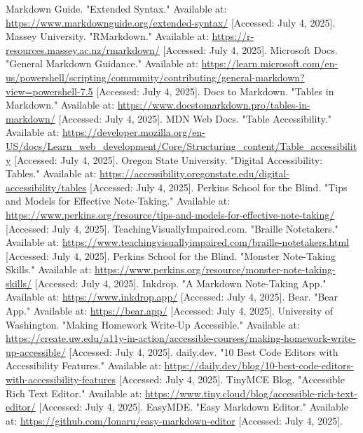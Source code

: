\begin{thebibliography}{99}
	 Markdown Guide. "Extended Syntax." Available at: \url{https://www.markdownguide.org/extended-syntax/} [Accessed: July 4, 2025].
	 Massey University. "RMarkdown." Available at: \url{https://r-resources.massey.ac.nz/rmarkdown/} [Accessed: July 4, 2025].
	 Microsoft Docs. "General Markdown Guidance." Available at: \url{https://learn.microsoft.com/en-us/powershell/scripting/community/contributing/general-markdown?view=powershell-7.5} [Accessed: July 4, 2025].
	 Docs to Markdown. "Tables in Markdown." Available at: \url{https://www.docstomarkdown.pro/tables-in-markdown/} [Accessed: July 4, 2025].
	 MDN Web Docs. "Table Accessibility." Available at: \url{https://developer.mozilla.org/en-US/docs/Learn_web_development/Core/Structuring_content/Table_accessibility} [Accessed: July 4, 2025].
	 Oregon State University. "Digital Accessibility: Tables." Available at: \url{https://accessibility.oregonstate.edu/digital-accessibility/tables} [Accessed: July 4, 2025].
	 Perkins School for the Blind. "Tips and Models for Effective Note-Taking." Available at: \url{https://www.perkins.org/resource/tips-and-models-for-effective-note-taking/} [Accessed: July 4, 2025].
	 TeachingVisuallyImpaired.com. "Braille Notetakers." Available at: \url{https://www.teachingvisuallyimpaired.com/braille-notetakers.html} [Accessed: July 4, 2025].
	 Perkins School for the Blind. "Monster Note-Taking Skills." Available at: \url{https://www.perkins.org/resource/monster-note-taking-skills/} [Accessed: July 4, 2025].
	 Inkdrop. "A Markdown Note-Taking App." Available at: \url{https://www.inkdrop.app/} [Accessed: July 4, 2025].
	 Bear. "Bear App." Available at: \url{https://bear.app/} [Accessed: July 4, 2025].
	 University of Washington. "Making Homework Write-Up Accessible." Available at: \url{https://create.uw.edu/a11y-in-action/accessible-courses/making-homework-write-up-accessible/} [Accessed: July 4, 2025].
	 daily.dev. "10 Best Code Editors with Accessibility Features." Available at: \url{https://daily.dev/blog/10-best-code-editors-with-accessibility-features} [Accessed: July 4, 2025].
	 TinyMCE Blog. "Accessible Rich Text Editor." Available at: \url{https://www.tiny.cloud/blog/accessible-rich-text-editor/} [Accessed: July 4, 2025].
	 EasyMDE. "Easy Markdown Editor." Available at: \url{https://github.com/Ionaru/easy-markdown-editor} [Accessed: July 4, 2025].

\end{thebibliography}
